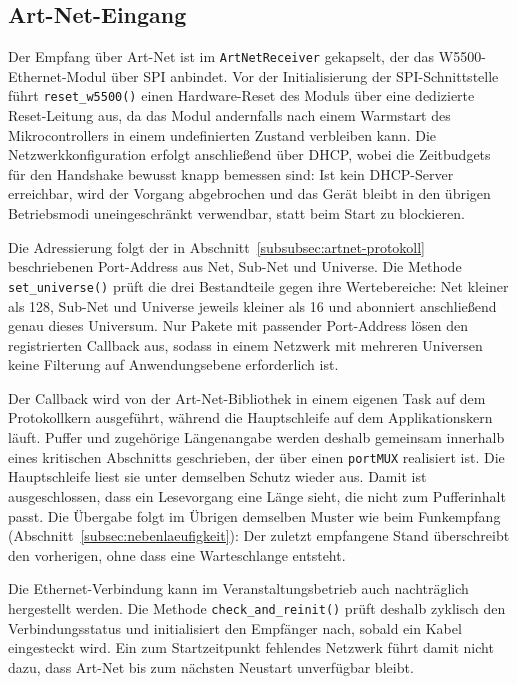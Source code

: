 \subsection{Art-Net-Eingang}
\label{subsec:artnet-eingang}

Der Empfang über Art-Net ist im \texttt{ArtNetReceiver} gekapselt, der
das W5500-Ethernet-Modul über SPI anbindet. Vor der Initialisierung der
SPI-Schnittstelle führt \texttt{reset\_w5500()} einen Hardware-Reset des
Moduls über eine dedizierte Reset-Leitung aus, da das Modul andernfalls
nach einem Warmstart des Mikrocontrollers in einem undefinierten Zustand
verbleiben kann. Die Netzwerkkonfiguration erfolgt anschließend über
DHCP, wobei die Zeitbudgets für den Handshake bewusst knapp bemessen
sind: Ist kein DHCP-Server erreichbar, wird der Vorgang abgebrochen und
das Gerät bleibt in den übrigen Betriebsmodi uneingeschränkt verwendbar,
statt beim Start zu blockieren.

Die Adressierung folgt der in Abschnitt~\ref{subsubsec:artnet-protokoll}
beschriebenen Port-Address aus Net, Sub-Net und Universe. Die Methode
\texttt{set\_universe()} prüft die drei Bestandteile gegen ihre
Wertebereiche: Net kleiner als 128, Sub-Net und Universe jeweils
kleiner als 16 und abonniert anschließend genau dieses Universum. Nur
Pakete mit passender Port-Address lösen den registrierten Callback aus,
sodass in einem Netzwerk mit mehreren Universen keine Filterung auf
Anwendungsebene erforderlich ist.

Der Callback wird von der Art-Net-Bibliothek in einem eigenen Task auf
dem Protokollkern ausgeführt, während die Hauptschleife auf dem
Applikationskern läuft. Puffer und zugehörige Längenangabe werden
deshalb gemeinsam innerhalb eines kritischen Abschnitts geschrieben, der
über einen \texttt{portMUX} realisiert ist. Die Hauptschleife liest sie
unter demselben Schutz wieder aus. Damit ist ausgeschlossen, dass ein
Lesevorgang eine Länge sieht, die nicht zum Pufferinhalt passt. Die
Übergabe folgt im Übrigen demselben Muster wie beim Funkempfang
(Abschnitt~\ref{subsec:nebenlaeufigkeit}): Der zuletzt empfangene Stand
überschreibt den vorherigen, ohne dass eine Warteschlange entsteht.

Die Ethernet-Verbindung kann im Veranstaltungsbetrieb auch nachträglich
hergestellt werden. Die Methode \texttt{check\_and\_reinit()} prüft
deshalb zyklisch den Verbindungsstatus und initialisiert den Empfänger
nach, sobald ein Kabel eingesteckt wird. Ein zum Startzeitpunkt fehlendes Netzwerk führt damit
nicht dazu, dass Art-Net bis zum nächsten Neustart unverfügbar bleibt.


